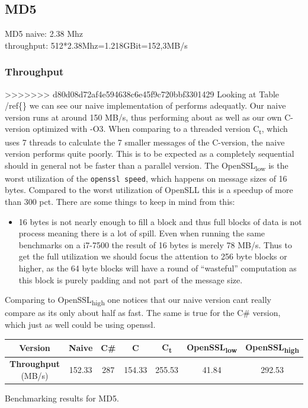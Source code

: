 \documentclass[a4paper]{article}
\begin{document}
\begin{enumerate}
\subsection{MD5}
\label{sec:orgebef477}
MD5 naive: 2.38 Mhz\\
throughput: 512*2.38Mhz=1.218GBit=152,3MB/s
\subsubsection{Throughput}
\label{sec:org404e011}
>>>>>>> d80d08d72af4e594638c6e45f9c720bbf3301429
Looking at Table /ref\{\} we can see our naive implementation of performs adequatly. Our naive version runs at around 150 MB/s, thus performing about as well as our own C-version optimized with -O3. When comparing to a threaded version C\textsubscript{t}, which uses 7 threads to calculate the 7 smaller messages of the C-version, the naive version performs quite poorly. This is to be expected as a completely sequential should in general not be faster than a parallel version. The OpenSSL\textsubscript{low} is the worst utilization of the \texttt{openssl speed}, which happens on message sizes of 16 bytes. Compared to the worst utilization of OpenSLL this is a speedup of more than 300 pct. There are some things to keep in mind from this:
\begin{itemize}
\item 16 bytes is not nearly enough to fill a block and thus full blocks of data is not process meaning there is a lot of spill. Even when running the same benchmarks on a i7-7500 the result of 16 bytes is merely 78 MB/s. Thus to get the full utilization we should focus the attention to 256 byte blocks or higher, as the 64 byte blocks will have a round of ``wasteful'' computation as this block is purely padding and not part of the message size.
\end{itemize}
Comparing to OpenSSL\textsubscript{high} one notices that our naive version cant really compare as its only about half as fast. The same is true for the C\# version, which just as well could be using openssl.
\begin{table}[htbp]
\centering
\begin{tabular}{|c|c|c|c|c|c|c|}
\hline
\textbf{Version} & Naive & C\# & C & C\textsubscript{t} & OpenSSL\textsubscript{low} & OpenSSL\textsubscript{high}\\
\hline
\textbf{Throughput} (MB/s) & 152.33 & 287 & 154.33 & 255.53 & 41.84 & 292.53\\
\hline
\end{tabular}
Benchmarking results for MD5.


\end{table}
\end{enumerate}
\end{document}
